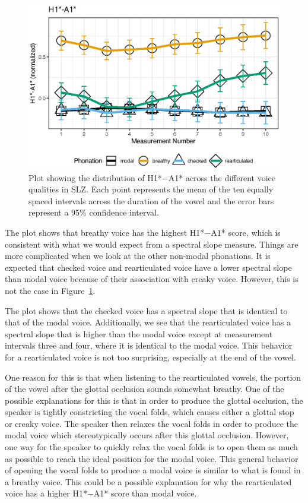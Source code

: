 \begin{figure}[h!]
    \centering
    \includegraphics[width = 0.9\linewidth]{images/h1a1_line.eps}
    \caption{Plot showing the distribution of H1*$-$A1* across the different voice qualities in SLZ. Each point represents the mean of the ten equally spaced intervals across the duration of the vowel and the error bars represent a 95\% confidence interval.}
    \label{fig:h1a1}
\end{figure}

The plot shows that breathy voice has the highest H1*$-$A1* score, which is consistent with what we would expect from a spectral slope measure. Things are more complicated when we look at the other non-modal phonations. It is expected that checked voice and rearticulated voice have a lower spectral slope than modal voice because of their association with creaky voice. However, this is not the case in Figure~\ref{fig:h1a1}. 

The plot shows that the checked voice has a spectral slope that is identical to that of the modal voice. Additionally, we see that the rearticulated voice has a spectral slope that is higher than the modal voice except at measurement intervals three and four, where it is identical to the modal voice. This behavior for a rearticulated voice is not too surprising, especially at the end of the vowel. 

One reason for this is that when listening to the rearticulated vowels, the portion of the vowel after the glottal occlusion sounds somewhat breathy. One of the possible explanations for this is that in order to produce the glottal occlusion, the speaker is tightly constricting the vocal folds, which causes either a glottal stop or creaky voice. The speaker then relaxes the vocal folds in order to produce the modal voice which stereotypically occurs after this glottal occlusion. However, one way for the speaker to quickly relax the vocal folds is to open them as much as possible to reach the ideal position for the modal voice. This general behavior of opening the vocal folds to produce a modal voice is similar to what is found in a breathy voice. This could be a possible explanation for why the rearticulated voice has a higher H1*$-$A1* score than modal voice.

